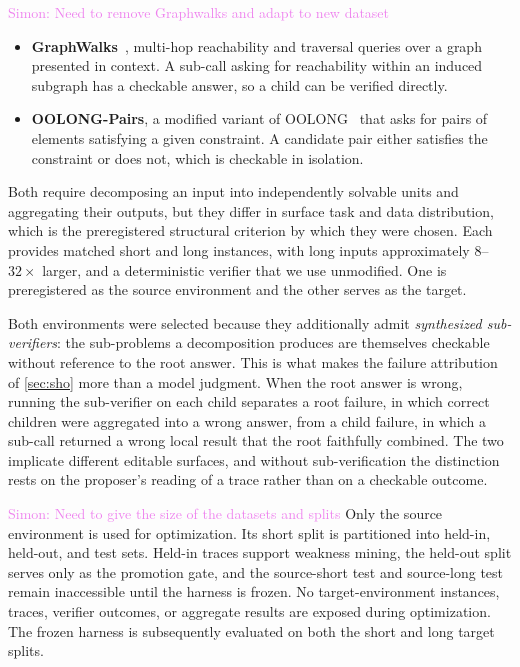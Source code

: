 \documentclass{article}
\newcommand{\SC}[1]{\textcolor{violet}{Simon: #1}}
\begin{document}
\SC{Need to remove Graphwalks and adapt to new dataset}
\begin{itemize}
\item \textbf{GraphWalks}~\citep{openai2025graphwalks}, multi-hop reachability and traversal queries over a graph presented in context. A sub-call asking for reachability within an induced subgraph has a checkable answer, so a child can be verified directly.
\item \textbf{OOLONG-Pairs}, a modified variant of OOLONG~\citep{bertsch2025oolong} that asks for pairs of elements satisfying a given constraint. A candidate pair either satisfies the constraint or does not, which is checkable in isolation.
\end{itemize}

\noindent Both require decomposing an input into independently solvable units and aggregating their outputs, but they differ in surface task and data distribution, which is the preregistered structural criterion by which they were chosen. Each provides matched short and long instances, with long inputs approximately $8$--$32\times$ larger, and a deterministic verifier that we use unmodified. One is preregistered as the source environment and the other serves as the target.

Both environments were selected because they additionally admit \emph{synthesized sub-verifiers}: the sub-problems a decomposition produces are themselves checkable without reference to the root answer. This is what makes the failure attribution of \cref{sec:sho} more than a model judgment. When the root answer is wrong, running the sub-verifier on each child separates a root failure, in which correct children were aggregated into a wrong answer, from a child failure, in which a sub-call returned a wrong local result that the root faithfully combined. The two implicate different editable surfaces, and without sub-verification the distinction rests on the proposer's reading of a trace rather than on a checkable outcome.

\SC{Need to give the size of the datasets and splits}
Only the source environment is used for optimization. Its short split is partitioned into held-in, held-out, and test sets. Held-in traces support weakness mining, the held-out split serves only as the promotion gate, and the source-short test and source-long test remain inaccessible until the harness is frozen. No target-environment instances, traces, verifier outcomes, or aggregate results are exposed during optimization. The frozen harness is subsequently evaluated on both the short and long target splits.
\end{document}

